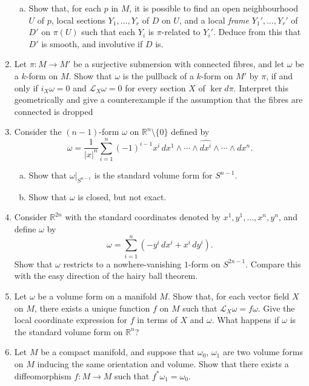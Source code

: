 \documentclass[11pt]{article} %
\begin{document}
\begin{enumerate}
\begin{enumerate}[(a)]
		\item Show that, for each $p$ in $M$, it is possible to find an open neighbourhood $U$ of $p$, local sections $Y_1, \dots, Y_r$ of $D$ on $U$, and a local \emph{frame} $Y_1', \dots, Y_r'$ of $D'$ on $\pi(U)$ such that each $Y_i$ is $\pi$-related to $Y_i'$. Deduce from this that $D'$ is smooth, and involutive if $D$ is. 
	\end{enumerate}

	\item Let $\pi\colon M \to M'$ be a surjective submersion with connected fibres, and let $\omega$ be a $k$-form on $M$. Show that $\omega$ is the pullback of a $k$-form on $M'$ by $\pi$, if and only if $i_X\omega = 0$ and $\mathcal{L}_X\omega = 0$ for every section $X$ of $\ker d\pi$. Interpret this geometrically and give a counterexample if the assumption that the fibres are connected is dropped

	\item Consider the $(n - 1)$-form $\omega$ on $\mathbb{R}^n \setminus \{0\}$ defined by 
	\[
		\omega = \frac{1}{|x|^n} \sum_{i=1}^n (-1)^{i - 1} x^i \, dx^1 \wedge \cdots \wedge \widehat{dx^i} \wedge \cdots \wedge dx^n.
	\]
	\begin{enumerate}[(a)]
		\item Show that $\omega|_{S^{n-1}}$ is the standard volume form for $S^{n-1}$.
		\item Show that $\omega$ is closed, but not exact.
	\end{enumerate}

	\item Consider $\mathbb{R}^{2n}$ with the standard coordinates denoted by $x^1,y^1,\dots,x^n,y^n$, and define $\omega$ by 
	\[
		\omega = \sum_{i=1}^n \left(-y^i \, dx^i + x^i \, dy^i \right).
	\]
	Show that $\omega$ restricts to a nowhere-vanishing $1$-form on $S^{2n - 1}$. Compare this with the easy direction of the hairy ball theorem.

	\item Let $\omega$ be a volume form on a manifold $M$. Show that, for each vector field $X$ on $M$, there exists a unique function $f$ on $M$ such that $\mathcal{L}_X\omega = f\omega$. Give the local coordinate expression for $f$ in terms of $X$ and $\omega$. What happens if $\omega$ is the standard volume form on $\mathbb{R}^n$? 

	\item Let $M$ be a compact manifold, and suppose that $\omega_0$, $\omega_1$ are two volume forms on $M$ inducing the same orientation and volume. Show that there exists a diffeomorphism $f\colon M \to M$ such that $f^*\omega_1 = \omega_0$. 


\end{enumerate}
\end{document}
